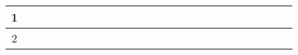 \begin{table}[h]
\begin{tabular}{|c|cccccccccccc|cccccccccccc|}
		1                        & \multicolumn{1}{c|}{} & \multicolumn{1}{c|}{\cellcolor[HTML]{009901}} & \multicolumn{1}{c|}{\cellcolor[HTML]{009901}} & \multicolumn{1}{c|}{\cellcolor[HTML]{009901}} & \multicolumn{1}{c|}{\cellcolor[HTML]{009901}} & \multicolumn{1}{c|}{}                         & \multicolumn{1}{c|}{}                         & \multicolumn{1}{c|}{}                         & \multicolumn{1}{c|}{}                         & \multicolumn{1}{c|}{}                         & \multicolumn{1}{c|}{}                         &                          & \multicolumn{1}{c|}{}                         & \multicolumn{1}{c|}{}                         & \multicolumn{1}{c|}{}                         & \multicolumn{1}{c|}{}                         & \multicolumn{1}{c|}{}                         & \multicolumn{1}{c|}{}                         & \multicolumn{1}{c|}{}                         & \multicolumn{1}{c|}{}                         & \multicolumn{1}{c|}{}                         & \multicolumn{1}{c|}{}                         & \multicolumn{1}{c|}{}                         &  \\ \hline
		2                        & \multicolumn{1}{c|}{} & \multicolumn{1}{c|}{}                         & \multicolumn{1}{c|}{\cellcolor[HTML]{009901}} & \multicolumn{1}{c|}{\cellcolor[HTML]{009901}} & \multicolumn{1}{c|}{\cellcolor[HTML]{009901}} & \multicolumn{1}{c|}{\cellcolor[HTML]{009901}} & \multicolumn{1}{c|}{}                         & \multicolumn{1}{c|}{}                         & \multicolumn{1}{c|}{}                         & \multicolumn{1}{c|}{}                         & \multicolumn{1}{c|}{}                         &                          & \multicolumn{1}{c|}{}                         & \multicolumn{1}{c|}{}                         & \multicolumn{1}{c|}{}                         & \multicolumn{1}{c|}{}                         & \multicolumn{1}{c|}{}                         & \multicolumn{1}{c|}{}                         & \multicolumn{1}{c|}{}                         & \multicolumn{1}{c|}{}                         & \multicolumn{1}{c|}{}                         & \multicolumn{1}{c|}{}                         & \multicolumn{1}{c|}{}                         &  \\ \hline

\end{tabular}
\end{table}
